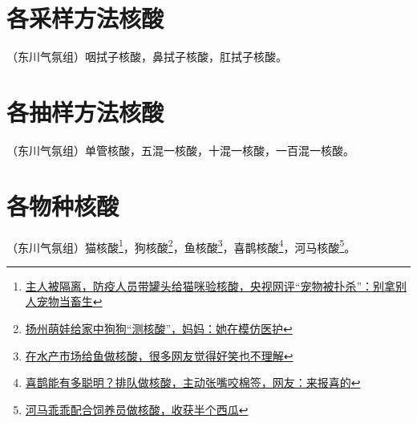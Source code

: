 \documentclass{ctexbook}
\begin{document}
\section{各采样方法核酸}
（东川气氛组）咽拭子核酸，鼻拭子核酸，肛拭子核酸。

\section{各抽样方法核酸}
（东川气氛组）单管核酸，五混一核酸，十混一核酸，一百混一核酸。

\section{各物种核酸}
（东川气氛组）猫核酸\footnote{\href{https://www.163.com/dy/article/GOS3PHOI05199NPP.html}{主人被隔离，防疫人员带罐头给猫咪验核酸，央视网评“宠物被扑杀”：别拿别人宠物当畜生}}，狗核酸\footnote{\href{https://www.thepaper.cn/newsDetail_forward_13916282}{扬州萌娃给家中狗狗“测核酸”，妈妈：她在模仿医护}}，鱼核酸\footnote{\href{https://www.163.com/dy/article/H3KS18UU0552Y6AK.html}{在水产市场给鱼做核酸，很多网友觉得好笑也不理解}}，喜鹊核酸\footnote{\href{https://www.163.com/dy/article/GUR8U0RM0522CD4O.html}{喜鹊能有多聪明？排队做核酸，主动张嘴咬棉签，网友：来报喜的}}，河马核酸\footnote{\href{https://www.thepaper.cn/newsDetail_forward_17997745}{河马乖乖配合饲养员做核酸，收获半个西瓜}}。
\end{document}
